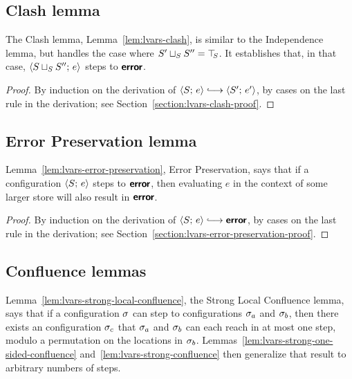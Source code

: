 \subsection{Clash lemma}

The Clash lemma, Lemma~\ref{lem:lvars-clash}, is similar to the
Independence lemma, but handles the case where $S' \sqcup_{S} S'' =
\top\hspace{-0.85mm}_{S}$.  It establishes that, in that case,
$\langle S \sqcup_{S} S'';\, e \rangle$ steps to $\textbf{\textsf{error}}$.


\LVarsLemClash
\begin{proof}
  By induction on the derivation of $\config{S}{e} \parstepsto
  \config{S'}{e'}$, by cases on the last rule in the derivation; see
  Section~\ref{section:lvars-clash-proof}.
\end{proof}

\subsection{Error Preservation lemma}

Lemma~\ref{lem:lvars-error-preservation}, Error Preservation, says
that if a configuration $\langle S;\, e \rangle$ steps to $\textbf{\textsf{error}}$, then
evaluating $e$ in the context of some larger store will also result in
$\textbf{\textsf{error}}$.


\LVarsLemErrorPreservation
\begin{proof}
  By induction on the derivation of $\config{S}{e} \parstepsto
  \error$, by cases on the last rule in the derivation; see
  Section~\ref{section:lvars-error-preservation-proof}.
\end{proof}

\subsection{Confluence lemmas}\label{subsection:lvars-confluence}

Lemma~\ref{lem:lvars-strong-local-confluence}, the Strong Local
Confluence lemma, says that if a configuration $\sigma$ can step to
configurations $\sigma_a$ and $\sigma_b$, then there exists an
configuration $\sigma_c$ that $\sigma_a$ and $\sigma_b$ can each reach in
at most one step, modulo a permutation on the locations in $\sigma_b$.
Lemmas~\ref{lem:lvars-strong-one-sided-confluence}
and~\ref{lem:lvars-strong-confluence} then generalize that result to
arbitrary numbers of steps.

